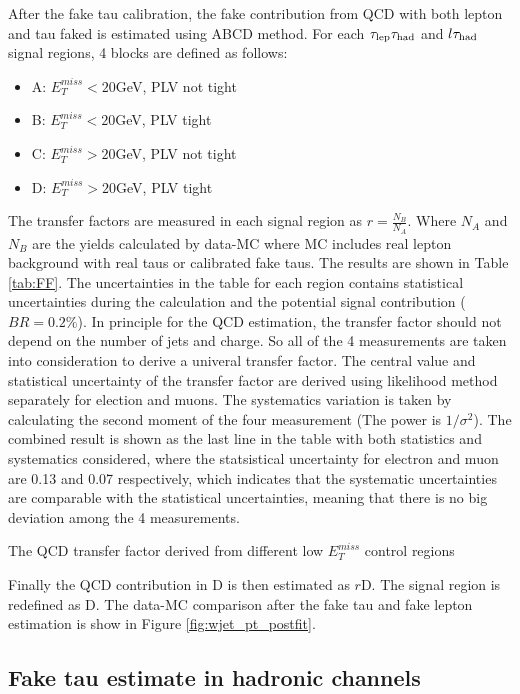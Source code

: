 After the fake tau calibration, the fake contribution from QCD with both lepton and tau faked is estimated using ABCD method. For each $\tau_\text{lep}{}\tau_\text{had}$ and $l\tau_\text{had}$ signal regions, 4 blocks are defined as follows:

\begin{itemize}
	\item A: $E_T^{miss}<20$GeV, PLV not tight
	\item B: $E_T^{miss}<20$GeV, PLV tight
	\item C: $E_T^{miss}>20$GeV, PLV not tight
	\item D: $E_T^{miss}>20$GeV, PLV tight
\end{itemize}
The transfer factors are measured in each signal region as $r=\frac{N_B}{N_A}$. Where $N_A$ and $N_B$ are the yields calculated by data-MC where MC includes real lepton background with real taus or calibrated fake taus. The results are shown in Table \ref{tab:FF}. The uncertainties in the table for each region contains statistical uncertainties during the calculation and the potential signal contribution ($BR=0.2\%$). In principle for the QCD estimation, the transfer factor should not depend on the number of jets and charge. So all of the 4 measurements are taken into consideration to derive a univeral transfer factor. The central value and statistical uncertainty of the transfer factor are derived using likelihood method separately for election and muons. The systematics variation is taken by calculating the second moment of the four measurement (The power is $1/\sigma^2$). The combined result is shown as the last line in the table with both statistics and systematics considered, where the statsistical uncertainty for electron and muon are 0.13 and 0.07 respectively, which indicates that the systematic uncertainties are comparable with the statistical uncertainties, meaning that there is no big deviation among the 4 measurements.

\begin{table}
\caption{The QCD transfer factor derived from different low $E_T^{miss}$ control regions}
\label{tab:FF}

\end{table}

Finally the QCD contribution in D is then estimated as $r$D. The signal region is redefined as D.
The data-MC comparison after the fake tau and fake lepton estimation is show in Figure \ref{fig:wjet_pt_postfit}.


\subsection{Fake tau estimate in hadronic channels}
\label{sec:ss_method}

